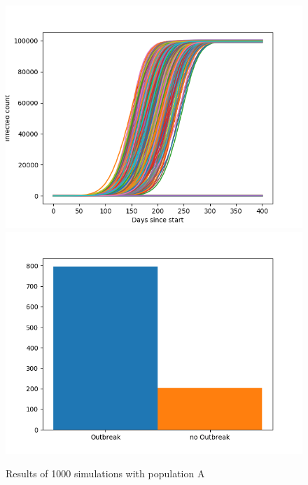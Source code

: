 \documentclass[runningheads]{llncs}
\begin{document}
	\begin{figure}
		\includegraphics[width=\textwidth]{outbreaks_populationA.png}
		\includegraphics[width=\textwidth]{barchart_populationA.png}
		\caption{Results of 1000 simulations with population A}
	\end{figure}
\end{document}
